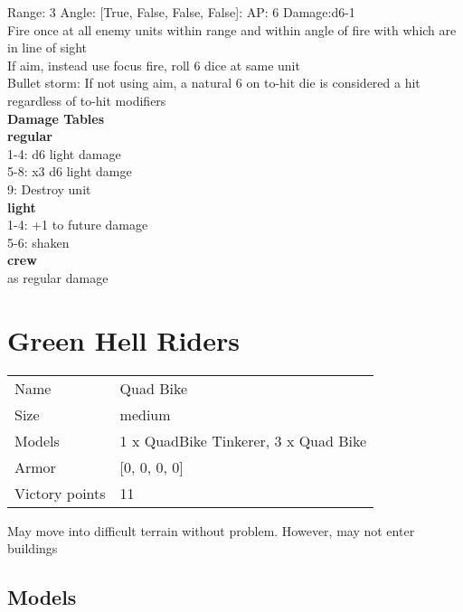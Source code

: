 Range: 3  Angle: [True, False, False, False]: AP: 6 Damage:d6-1 \\
Fire once at all enemy units within range and within angle of fire with which are in line of sight\\ 
If aim, instead use focus fire, roll 6 dice at same unit\\ 
Bullet storm: If not using aim, a natural 6 on to-hit die is considered a hit regardless of to-hit modifiers\\ 




 





{\bf Damage Tables} \\
 {\bf regular } \\
1-4: d6 light damage \\
5-8: x3 d6 light damge \\
9: Destroy unit \\
 {\bf light } \\
1-4: +1 to future damage \\
5-6: shaken \\
 {\bf crew } \\
as regular damage \\










\pagebreak\pagebreak

\section{ Green Hell Riders }

\begin{tabular}{ll}
  Name & Quad Bike \\
  Size & medium\\
  Models & 1 x QuadBike Tinkerer, 3 x Quad Bike\\
  Armor & [0, 0, 0, 0]\\
  Victory points & 11\\
\end{tabular}

May move into difficult terrain without problem. However, may not enter buildings\\ 


\subsection{ Models }

